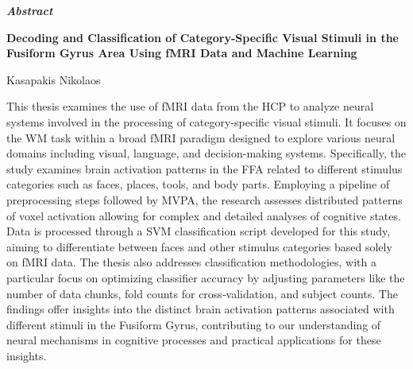 \thispagestyle{plain}
\vspace*{\fill}
\begin{center}
    \LARGE
    \textit{\textbf{Abstract}}
        
    \vspace{0.4cm}
    \large
    \textbf{Decoding and Classification of Category-Specific Visual Stimuli in the Fusiform Gyrus Area Using fMRI Data and Machine Learning}
        
    \vspace{0.4cm}
    Kasapakis Nikolaos
\end{center}
\normalsize

\vspace{0.9cm}

This thesis examines the use of \gls{fMRI} data from the \gls{HCP} to analyze neural systems involved in the processing of category-specific visual stimuli. It focuses on the \gls{WM} task within a broad \gls{fMRI} paradigm designed to explore various neural domains including visual, language, and decision-making systems. Specifically, the study examines brain activation patterns in the \gls{FFA} related to different stimulus categories such as faces, places, tools, and body parts. Employing a pipeline of preprocessing steps followed by \gls{MVPA}, the research assesses distributed patterns of voxel activation allowing for complex and detailed analyses of cognitive states. Data is processed through a \gls{SVM} classification script developed for this study, aiming to differentiate between faces and other stimulus categories based solely on \gls{fMRI} data. The thesis also addresses classification methodologies, with a particular focus on optimizing classifier accuracy by adjusting parameters like the number of data chunks, fold counts for cross-validation, and subject counts. The findings offer insights into the distinct brain activation patterns associated with different stimuli in the Fusiform Gyrus, contributing to our understanding of neural mechanisms in cognitive processes and practical applications for these insights.

\vspace*{\fill}


